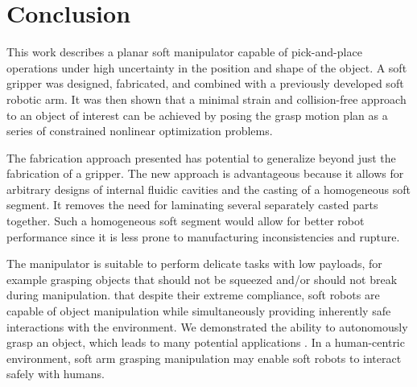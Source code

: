 \section{Conclusion}
\label{sec:conclusion}
This work describes a planar soft manipulator capable of pick-and-place operations under high uncertainty in the position and shape of the object. 
A soft gripper was designed, fabricated, and combined with a previously developed soft robotic arm.
It was then shown that a minimal strain and collision-free approach to an object of interest can be achieved by posing the grasp motion plan as a series of constrained nonlinear optimization problems.

The fabrication approach presented has potential to generalize beyond just the fabrication of a gripper.
The new approach is advantageous because it allows for arbitrary designs of internal fluidic cavities and the casting of a homogeneous soft segment. It removes the need for laminating several separately casted parts together.
Such a homogeneous soft segment would allow for better robot performance since it is less prone to manufacturing inconsistencies and rupture.

The manipulator is suitable to perform delicate tasks with low payloads, for example grasping objects that should not be squeezed and/or should not break during manipulation.
 that despite their extreme compliance, soft robots are capable of  object manipulation while simultaneously providing inherently safe interactions with the environment.
We  demonstrated the  ability to autonomously grasp an object, which leads to many potential applications .
In a human-centric environment, soft arm grasping manipulation may enable soft robots to interact safely with humans.

